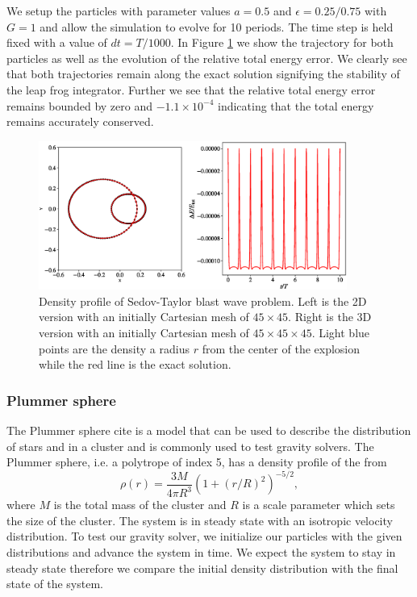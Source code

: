 We setup the particles with parameter values $a=0.5$ and $\epsilon=0.25/0.75$ with $G=1$ and allow
the simulation to evolve for 10 periods. The time step is held fixed with a value of $dt=T/1000$.
In Figure \ref{fig.two_body} we show the trajectory for both particles as well as the evolution of
the relative total energy error. We clearly see that both trajectories remain along the exact solution
signifying the stability of the leap frog integrator. Further we see that the relative total energy
error remains bounded by zero and $-1.1\times10^{-4}$ indicating that the total energy remains
accurately conserved.
\begin{figure}
    \begin{center}
        \includegraphics[width=0.9\textwidth]{figures/two_body.eps}
        \caption{Density profile of Sedov-Taylor blast wave problem. Left is the 2D version with an initially
        Cartesian mesh of $45 \times 45$. Right is the 3D version with an initially Cartesian mesh of 
        $45 \times 45 \times 45$. Light blue points are the density a radius $r$ from the center of the explosion
        while the red line is the exact solution.}
        \label{fig.two_body}
    \end{center}
\end{figure}

\subsubsection{Plummer sphere}
The Plummer sphere cite is a model that can be used to describe the distribution of stars and in a cluster
and is commonly used to test gravity solvers. The Plummer sphere, i.e. a polytrope of index 5,
has a density profile of the from
\begin{equation}
	\rho (r) = \frac{3 M}{4\pi R^3} \left(1 + (r/R)^2\right)^{-5/2},
    \label{eq.plummer}
\end{equation}
where $M$ is the total mass of the cluster and $R$ is a scale parameter which sets the
size of the cluster. The system is in steady state with an isotropic velocity distribution.
To test our gravity solver, we initialize our particles with the given distributions and
advance the system in time. We expect the system to stay in steady state therefore we compare
the initial density distribution with the final state of the system.


